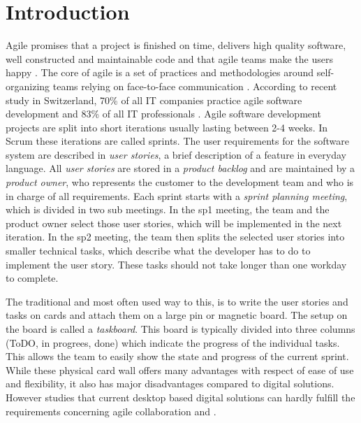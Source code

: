 \documentclass{sigchi}
\begin{document}

\section{Introduction}
Agile promises that a project is finished on time, delivers high quality software, well constructed and maintainable code and that agile teams make the users happy \cite{Stellman:2014}.
The core of agile is a set of practices and methodologies around self-organizing teams relying on face-to-face communication \cite{Cockburn:2001}.
According to recent study in Switzerland, 70\% of all IT companies practice agile software development and 83\% of all IT professionals \cite{Kropp:2015}.
Agile software development projects are split into short iterations usually lasting between 2-4 weeks. In Scrum these iterations are called sprints.
The user requirements for the software system are described in \textit{user stories}, a brief description of a feature in everyday language.
All \textit{user stories} are stored in a \textit{product backlog} and are maintained by a \textit{product owner}, who represents the customer to the development team and who is in charge of all requirements.
Each sprint starts with a \textit{sprint planning meeting}, which is divided in two sub meetings. In the \gls{sp1} meeting, the team and the product owner select those user stories, which will be implemented in the next iteration.
In the \gls{sp2} meeting, the team then splits the selected user stories into smaller technical tasks, which describe what the developer has to do to implement the user story. These tasks should not take longer than one workday to complete.

The traditional and most often used way to this, is to write the user stories and tasks on cards and attach them on a large pin or magnetic board.
The setup on the board is called a \textit{taskboard}. This board is typically divided into three columns (ToDO, in progrees, done) which indicate the progress of the individual tasks. This allows the team to easily show the state and progress of the current sprint. While these physical card wall offers many advantages with respect of ease of use and flexibility, it also has major disadvantages compared to digital solutions. However studies that current desktop based digital solutions can hardly fulfill the requirements concerning agile collaboration \cite{udcw:31721} and \cite{Mateescu:2015} .
\end{document}
